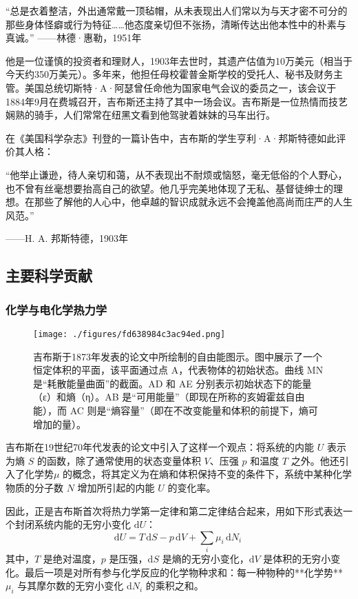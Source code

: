 “总是衣着整洁，外出通常戴一顶毡帽，从未表现出人们常以为与天才密不可分的那些身体怪癖或行为特征……他态度亲切但不张扬，清晰传达出他本性中的朴素与真诚。”
——林德·惠勒，1951年

他是一位谨慎的投资者和理财人，1903年去世时，其遗产估值为10万美元（相当于今天约350万美元）。多年来，他担任母校霍普金斯学校的受托人、秘书及财务主管。美国总统切斯特·A·阿瑟曾任命他为国家电气会议的委员之一，该会议于1884年9月在费城召开，吉布斯还主持了其中一场会议。吉布斯是一位热情而技艺娴熟的骑手，人们常常在纽黑文看到他驾驶着妹妹的马车出行。

在《美国科学杂志》刊登的一篇讣告中，吉布斯的学生亨利·A·邦斯特德如此评价其人格：

“他举止谦逊，待人亲切和蔼，从不表现出不耐烦或恼怒，毫无低俗的个人野心，也不曾有丝毫想要抬高自己的欲望。他几乎完美地体现了无私、基督徒绅士的理想。在那些了解他的人心中，他卓越的智识成就永远不会掩盖他高尚而庄严的人生风范。”

——H. A. 邦斯特德，1903年
\subsection{主要科学贡献}
\subsubsection{化学与电化学热力学}
\begin{figure}[ht]
\centering
\texttt{[image: ./figures/fd638984c3ac94ed.png]}
\caption{吉布斯于1873年发表的论文中所绘制的自由能图示。图中展示了一个恒定体积的平面，该平面通过点 A，代表物体的初始状态。曲线 MN 是“耗散能量曲面”的截面。AD 和 AE 分别表示初始状态下的能量（ε）和熵（η）。AB 是“可用能量”（即现在所称的亥姆霍兹自由能），而 AC 则是“熵容量”（即在不改变能量和体积的前提下，熵可增加的量）。} \label{fig_QSY_6}
\end{figure}
吉布斯在19世纪70年代发表的论文中引入了这样一个观点：将系统的内能 $U$ 表示为熵 $S$ 的函数，除了通常使用的状态变量体积 $V$、压强 $p$ 和温度 $T$ 之外。他还引入了化学势$\mu$ 的概念，将其定义为在熵和体积保持不变的条件下，系统中某种化学物质的分子数 $N$ 增加所引起的内能 $U$ 的变化率。

因此，正是吉布斯首次将热力学第一定律和第二定律结合起来，用如下形式表达一个封闭系统内能的无穷小变化 $\mathrm{d}U$：
$$
\mathrm{d}U = T\,\mathrm{d}S - p\,\mathrm{d}V + \sum_i \mu_i\,\mathrm{d}N_i~
$$
其中，$T$ 是绝对温度，$p$ 是压强，$\mathrm{d}S$ 是熵的无穷小变化，$\mathrm{d}V$ 是体积的无穷小变化。最后一项是对所有参与化学反应的化学物种求和：每一种物种的**化学势** $\mu_i$ 与其摩尔数的无穷小变化 $\mathrm{d}N_i$ 的乘积之和。

